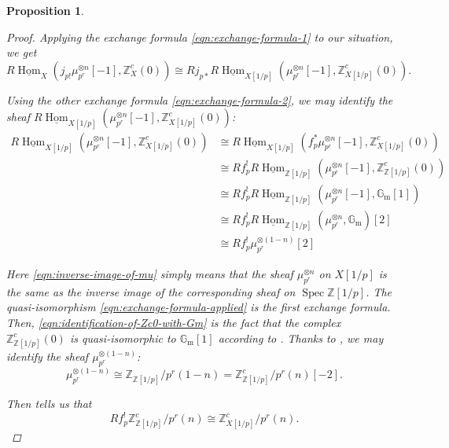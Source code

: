 \documentclass{article}
\DeclareMathOperator{\Hom}{Hom}
\DeclareMathOperator{\Spec}{Spec}
\newcommand{\ZZ}{\mathbb{Z}}
\newcommand{\iHom}{\underline{\Hom}}
\newtheorem{proposition}[theorem]{Proposition}
\theoremstyle{definition}
\numberwithin{equation}{section}
\begin{document}
\begin{proposition}
\begin{proof}
    Applying the exchange formula \eqref{eqn:exchange-formula-1} to our
    situation, we get
    \begin{equation}
      R\iHom_X (j_{p!} \mu_{p^r}^{\otimes n} [-1], \ZZ^c_X (0)) \cong
      R j_{p*} R\iHom_{X [1/p]} (\mu_{p^r}^{\otimes n} [-1], \ZZ^c_{X [1/p]} (0)).
    \end{equation}

    Using the other exchange formula \eqref{eqn:exchange-formula-2}, we may
    identify the sheaf
    $R\iHom_{X [1/p]} (\mu_{p^r}^{\otimes n} [-1], \ZZ^c_{X [1/p]} (0))$:
    \begin{align}
      \label{eqn:inverse-image-of-mu} R\iHom_{X [1/p]} (\mu_{p^r}^{\otimes n} [-1], \ZZ^c_{X [1/p]} (0)) & \cong R\iHom_{X[1/p]} (f_p^* \mu_{p^r}^{\otimes n} [-1], \ZZ^c_{X [1/p]} (0)) \\
      \label{eqn:exchange-formula-applied} & \cong R f^!_p R\iHom_{\ZZ [1/p]} (\mu_{p^r}^{\otimes n} [-1], \ZZ^c_{\ZZ [1/p]} (0)) \\
      \label{eqn:identification-of-Zc0-with-Gm} & \cong R f^!_p R\iHom_{\ZZ [1/p]} (\mu_{p^r}^{\otimes n} [-1], \mathbb{G}_\mathrm{m} [1]) \\
      & \cong R f^!_p R\iHom_{\ZZ [1/p]} (\mu_{p^r}^{\otimes n}, \mathbb{G}_\mathrm{m}) [2] \\
      & \cong R f^!_p \mu_{p^r}^{\otimes (1-n)} [2]
    \end{align}

    Here \eqref{eqn:inverse-image-of-mu} simply means that the sheaf
    $\mu_{p^r}^{\otimes n}$ on $X[1/p]$ is the same as the inverse image of the
    corresponding sheaf on $\Spec \ZZ [1/p]$. The quasi-isomorphism
    \eqref{eqn:exchange-formula-applied} is the first exchange formula. Then,
    \eqref{eqn:identification-of-Zc0-with-Gm} is the fact that the complex
    $\ZZ^c_{\ZZ [1/p]} (0)$ is quasi-isomorphic to $\mathbb{G}_\mathrm{m} [1]$
    according to \cite[Lemma 7.4]{Geisser-2010}. Thanks to
    \cite[Theorem 1.2]{Geisser-2004}, we may identify the sheaf
    $\mu_{p^r}^{\otimes (1-n)}$:
    \begin{equation}
      \mu_{p^r}^{\otimes (1-n)} \cong \ZZ_{\ZZ [1/p]}/p^r (1-n) =
      \ZZ^c_{\ZZ [1/p]}/p^r (n) [-2].
    \end{equation}

    Then \cite[Corollary 7.9]{Geisser-2010} tells us that
    \begin{equation}
      R f^!_p \ZZ^c_{\ZZ [1/p]} / p^r (n) \cong \ZZ^c_{X [1/p]} / p^r (n).
    \end{equation}


\end{proof}
\end{proposition}
\end{document}
